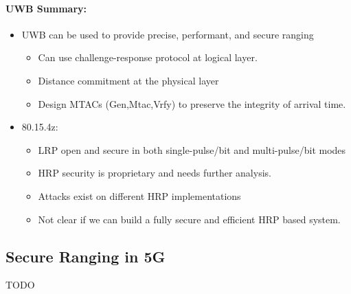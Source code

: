 \paragraph{UWB Summary:} 
\begin{itemize}
    \item UWB can be used to provide precise, performant, and secure ranging
    \begin{itemize}
        \item Can use challenge-response protocol at logical layer.
        \item Distance commitment at the physical layer
        \item Design MTACs (Gen,Mtac,Vrfy) to preserve the integrity of arrival time.
    \end{itemize}
    \item 80.15.4z: 
    \begin{itemize}
        \item LRP open and secure in both single-pulse/bit and multi-pulse/bit modes
        \item HRP security is proprietary and needs further analysis.
        \item Attacks exist on different HRP implementations
        \item Not clear if we can build a fully secure and efficient HRP based system.
    \end{itemize}
\end{itemize}

\subsection{Secure Ranging in 5G}
TODO